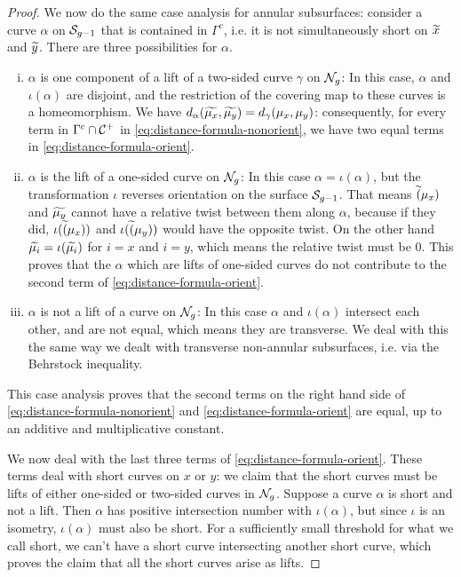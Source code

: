 \documentclass[12pt, reqno]{amsart}
\begin{document}
\begin{proof}
 We now do the same case analysis for annular subsurfaces: consider a curve $\alpha$ on $\mathcal{S}_{g-1}$ that is contained in $\Gamma^c$, i.e. it is not simultaneously short on $\widetilde{x}$ and $\widetilde{y}$. There are three possibilities for $\alpha$.
 \begin{enumerate}[(i)]
 \item $\alpha$ is one component of a lift of a two-sided curve $\gamma$ on $\mathcal{N}_g$: In this case, $\alpha$ and $\iota(\alpha)$ are disjoint, and the restriction of the covering map to these curves is a homeomorphism.
   We have $d_\alpha(\widetilde{\mu_x}, \widetilde{\mu_y}) = d_\gamma(\mu_x, \mu_y)$: consequently, for every term in $\Gamma^c \cap \mathcal{C}^+$ in \eqref{eq:distance-formula-nonorient}, we have two equal terms in \eqref{eq:distance-formula-orient}.
 \item $\alpha$ is the lift of a one-sided curve on $\mathcal{N}_g$: In this case $\alpha = \iota(\alpha)$, but the transformation $\iota$ reverses orientation on the surface $\mathcal{S}_{g-1}$.
   That means $\widetilde(\mu_x)$ and $\widetilde{\mu_y}$ cannot have a relative twist between them along $\alpha$, because if they did, $\iota(\widetilde(\mu_x))$ and $\iota(\widetilde(\mu_y))$ would have the opposite twist.
   On the other hand $\widetilde{\mu_i} = \iota(\widetilde{\mu_i})$ for $i=x$ and $i=y$, which means the relative twist must be $0$.
   This proves that the $\alpha$ which are lifts of one-sided curves do not contribute to the second term of \eqref{eq:distance-formula-orient}.
 \item $\alpha$ is not a lift of a curve on $\mathcal{N}_g$: In this case $\alpha$ and $\iota(\alpha)$ intersect each other, and are not equal, which means they are transverse.
   We deal with this the same way we dealt with transverse non-annular subsurfaces, i.e. via the Behrstock inequality.
 \end{enumerate}
 This case analysis proves that the second terms on the right hand side of \eqref{eq:distance-formula-nonorient} and \eqref{eq:distance-formula-orient} are equal, up to an additive and multiplicative constant.

We now deal with the last three terms of \eqref{eq:distance-formula-orient}.
These terms deal with short curves on $x$ or $y$: we claim that the short curves must be lifts of either one-sided or two-sided curves in $\mathcal{N}_g$.
Suppose a curve $\alpha$ is short and not a lift. Then $\alpha$ has positive intersection number with $\iota(\alpha)$, but since $\iota$ is an isometry, $\iota(\alpha)$ must also be short.
For a sufficiently small threshold for what we call short, we can't have a short curve intersecting another short curve, which proves the claim that all the short curves arise as lifts.


\end{proof}
\end{document}
